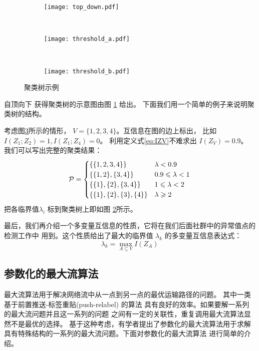  \begin{figure}[!ht]
    \centering
    \begin{subfigure}[b]{0.38\linewidth}
      \centering
      \texttt{[image: top\_down.pdf]}
      \caption{}\label{fig:top_down}
    \end{subfigure}~
  \begin{subfigure}[b]{0.33\linewidth}
    \centering
    \texttt{[image: threshold\_a.pdf]}
    \caption{}\label{fig:threshold_a}
  \end{subfigure}~
  \begin{subfigure}[b]{0.29\linewidth}
    \centering
    \texttt{[image: threshold\_b.pdf]}
    \caption{}\label{fig:threshold_b}
  \end{subfigure}
    \caption{聚类树示例}\label{fig:mmi_example}
  \end{figure}
自顶向下
获得聚类树的示意图由图 \ref{fig:top_down} 给出。
下面我们用一个简单的例子来说明聚类树的结构。
  \begin{example}\label{ex:mmi_tree}
考虑图\ref{fig:threshold_b}所示的情形，
$V=\{1,2,3,4\}$。互信息在图的边上标出，
比如 $I(Z_1;Z_2)=1, I(Z_1;Z_4)=0$。
利用定义式\ref{eq:IZV}不难求出
$I(Z_V)=0.9$。 
我们可以写出完整的聚类结果：
\begin{equation*}
\P = 
\begin{cases}
\{\{1,2,3,4\}\} & \lambda < 0.9 \\
\{\{1,2\},\{3,4\}\} & 0.9 \leq \lambda < 1 \\
\{\{1\},\{2\},\{3,4\}\} & 1 \leq \lambda < 2\\
\{\{1\},\{2\},\{3\},\{4\}\} & \lambda \geq 2
\end{cases}
\end{equation*}
把各临界值$\lambda_i$ 标到聚类树上即如图
\ref{fig:threshold_a}所示。
\end{example}
最后，我们再介绍一个多变量互信息的性质，它将在我们后面社群中的异常值点的检测工作中
用到。这个性质给出了最大的临界值 $\lambda_k$ 的多变量互信息表达式\cite{agg_ic}：
\begin{equation}\label{eq:largest_threshold}
\lambda_k = \max_{A\subseteq V} I(Z_A)
\end{equation}

\subsection{参数化的最大流算法}
最大流算法用于解决网络流中从一点到另一点的最优运输路径的问题。
其中一类基于前置推送-标签重贴(push-relabel) \cite{Goldberg1988} 的算法
具有良好的效率。如果要解一系列的最大流问题并且这一系列的问题
之间有一定的关联性，重复调用最大流算法显然不是最优的选择。
基于这种考虑，有学者提出了参数化的最大流算法\cite{Gallo1989}用于求解
具有特殊结构的一系列的最大流问题。下面对参数化的最大流算法
进行简单的介绍。

